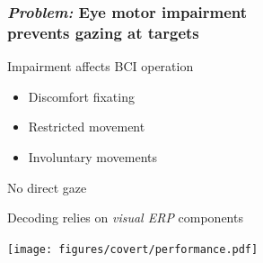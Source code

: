\documentclass{kul-ulille-beamer}
\begin{document}



\begin{frame}
  \frametitle{\emph{Problem:} Eye motor impairment \\  prevents gazing at targets}

  \begin{minipage}[c]{.4\textwidth}
    \raggedright
    Impairment affects BCI operation
    {\tiny\cite{FriedOken2020}}
    {\small
    \begin{itemize}
      \footnotesize
      \item Discomfort fixating
      \item Restricted movement
      \item Involuntary movements
    \end{itemize}
    }
    No direct gaze
    \bigskip
    \bigskip

    Decoding relies on \emph{visual ERP} components \\ {\tiny\cite{Treder2010}}
  \end{minipage}\hfill%
  \begin{minipage}[c]{.55\textwidth}
		\centering
		\texttt{[image: figures/covert/performance.pdf]}



	\end{minipage}
\end{frame}
\end{document}
